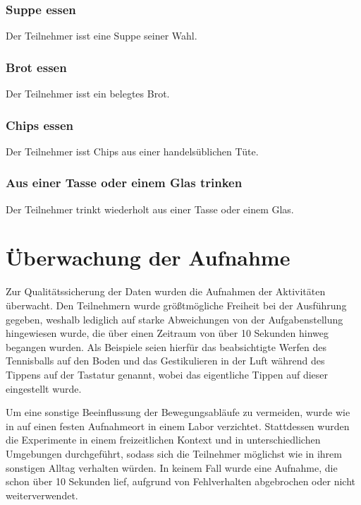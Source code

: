 \subsubsection{Suppe essen}
Der Teilnehmer isst eine Suppe seiner Wahl.
\subsubsection{Brot essen}
Der Teilnehmer isst ein belegtes Brot.
\subsubsection{Chips essen}
Der Teilnehmer isst Chips aus einer handelsüblichen Tüte.
\subsubsection{Aus einer Tasse oder einem Glas trinken}
Der Teilnehmer trinkt wiederholt aus einer Tasse oder einem Glas.

\section{Überwachung der Aufnahme}
Zur Qualitätssicherung der Daten wurden die Aufnahmen der Aktivitäten überwacht. Den Teilnehmern wurde größtmögliche Freiheit bei der Ausführung gegeben, weshalb lediglich auf starke Abweichungen von der Aufgabenstellung hingewiesen wurde, die über einen Zeitraum von über 10 Sekunden hinweg begangen wurden. Als Beispiele seien hierfür das beabsichtigte Werfen des Tennisballs auf den Boden und das Gestikulieren in der Luft während des Tippens auf der Tastatur genannt, wobei das eigentliche Tippen auf dieser eingestellt wurde.

Um eine sonstige Beeinflussung der Bewegungsabläufe zu vermeiden, wurde wie in  auf einen festen Aufnahmeort in einem Labor verzichtet. Stattdessen wurden die Experimente in einem freizeitlichen Kontext und in unterschiedlichen Umgebungen durchgeführt, sodass sich die Teilnehmer möglichst wie in ihrem sonstigen Alltag verhalten würden. In keinem Fall wurde eine Aufnahme, die schon über 10 Sekunden lief, aufgrund von Fehlverhalten abgebrochen oder nicht weiterverwendet.

